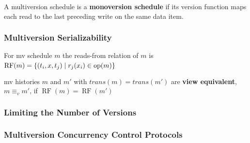 \documentclass[11pt]{article}
\DeclareMathOperator{\RF}{\text{RF}}
\begin{document}
\begin{definition}[]
A multiversion schedule is a \textbf{monoversion schedule} if its version function maps each read to the
last preceding write on the same data item.
\end{definition}
\subsubsection{Multiversion Serializability}
\label{sec:org897cdb5}
\begin{definition}[]
For mv schedule \(m\) the reads-from relation of \(m\) is \(\RF(m)=\{(t_i,x,t_j)\mid r_j(x_i)\in\op(m)\}\)
\end{definition}

\begin{definition}[]
mv histories \(m\) and \(m'\) with \(trans(m)=trans(m')\) are \textbf{view equivalent}, \(m\equiv_vm'\), if \(\RF(m)=\RF(m')\)
\end{definition}
\subsubsection{Limiting the Number of Versions}
\label{sec:orgbd88af2}
\subsubsection{Multiversion Concurrency Control Protocols}
\label{sec:org713af3b}
\end{document}
